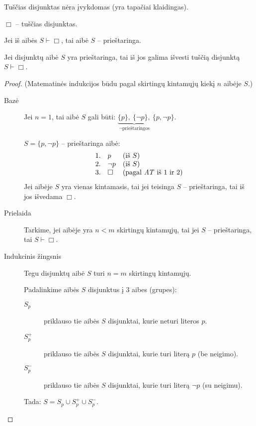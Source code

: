 Tuščias disjunktas nėra įvykdomas (yra tapačiai klaidingas).
\begin{notation}
  $\Box$ – tuščias disjunktas.
\end{notation}

Jei iš aibės $S \vdash \Box$, tai aibė $S$ – prieštaringa.

\begin{prop}
  Jei disjunktų aibė $S$ yra prieštaringa, tai iš jos galima išvesti 
  tuščią disjunktą $S \vdash \Box$.

  \begin{proof}
    (Matematinės indukcijos būdu pagal skirtingų kintamųjų kiekį $n$ 
    aibėje $S$.)

    \begin{description}
      \item[Bazė] Jei $n = 1$, tai aibė $S$ gali būti: 
        $\underbrace{\{p\},\: \{\neg p\},}_{\neg \text{prieštaringos}}%
        \:\{p,\neg p\}$.

        $S = \{p, \neg p\}$ – prieštaringa aibė:
        \[
        \begin{array}{l l l}
          1. & p & (\text{iš }S) \\
          2. & \neg p & (\text{iš }S) \\
          3. & \Box & (\text{pagal \emph{AT} iš 1 ir 2})
        \end{array}
        \]
        Jei aibėje $S$ yra vienas kintamasis, tai jei teisinga 
        $S$ – prieštaringa, tai iš jos išvedama $\Box$.

      \item[Prielaida] Tarkime, jei aibėje yra $n < m$ skirtingų 
        kintamųjų, tai jei $S$ – prieštaringa, tai $S \vdash \Box$.

      \item[Indukcinis žingsnis] Tegu disjunktų aibė $S$ turi $n = m$
        skirtingų kintamųjų.

        Padalinkime aibės $S$ disjunktus į 3 aibes (grupes):
        \begin{description}
          \item[$S_{p}$] priklauso tie aibės $S$ disjunktai, kurie neturi
            literos $p$.
          \item[$S_{p}^{+}$] priklauso tie aibės $S$ disjunktai, kurie turi
            literą $p$ (be neigimo).
          \item[$S_{p}^{-}$] priklauso tie aibės $S$ disjunktai, kurie turi
            literą $\neg p$ (su neigimu).
        \end{description}
        Tada: $S = S_{p} \cup S_{p}^{+} \cup S_{p}^{-}$.


\end{description}
\end{proof}
\end{prop}
